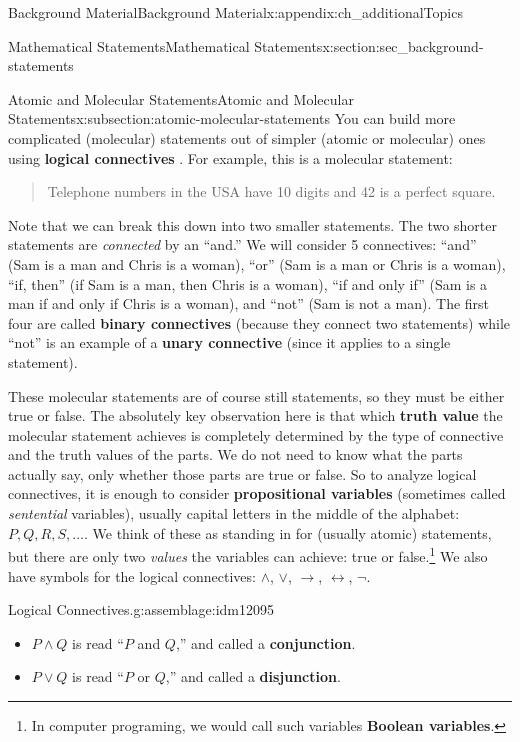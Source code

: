 \documentclass[oneside,10pt,]{book}
\newcommand{\terminology}[1]{\textbf{#1}}
\numberwithin{equation}{chapter}
\def\iff{\leftrightarrow}
\def\imp{\rightarrow}
\begin{document}
\begin{appendixptx}{Background Material}{}{Background Material}{}{}{x:appendix:ch_additionalTopics}
\begin{sectionptx}{Mathematical Statements}{}{Mathematical Statements}{}{}{x:section:sec_background-statements}
\begin{subsectionptx}{Atomic and Molecular Statements}{}{Atomic and Molecular Statements}{}{}{x:subsection:atomic-molecular-statements}
You can build more complicated (molecular) statements out of simpler (atomic or molecular) ones using \terminology{logical connectives} . For example, this is a molecular statement:%
\begin{quote}%
Telephone numbers in the USA have 10 digits and 42 is a perfect square.%
\end{quote}
Note that we can break this down into two smaller statements. The two shorter statements are \emph{connected} by an ``and.'' We will consider 5 connectives: ``and'' (Sam is a man and Chris is a woman), ``or'' (Sam is a man or Chris is a woman), ``if\textellipsis{}, then\textellipsis{}'' (if Sam is a man, then Chris is a woman), ``if and only if'' (Sam is a man if and only if Chris is a woman), and ``not'' (Sam is not a man). The first four are called \terminology{binary connectives} (because they connect two statements) while ``not'' is an example of a \terminology{unary connective} (since it applies to a single statement).%
\par
These molecular statements are of course still statements, so they must be either true or false.  The absolutely key observation here is that which \terminology{truth value}  the molecular statement achieves is completely determined by the type of connective and the truth values of the parts. We do not need to know what the parts actually say, only whether those parts are true or false. So to analyze logical connectives, it is enough to consider \terminology{propositional variables} (sometimes called \emph{sentential} variables), usually capital letters in the middle of the alphabet: \(P, Q, R, S, \ldots\).  We think of these as standing in for (usually atomic) statements, but there are only two \emph{values} the variables can achieve: true or false.\footnote{In computer programing, we would call such variables \terminology{Boolean variables}.\label{g:fn:idm12085}} \label{g:notation:idm12087} We also have symbols for the logical connectives: \(\wedge\), \(\vee\), \(\imp\), \(\iff\), \(\neg\).%
\begin{assemblage}{Logical Connectives.}{g:assemblage:idm12095}%
%
\begin{itemize}[label=\textbullet]
\item{}\(P \wedge Q\) is read ``\(P\) and \(Q\),'' and called a \terminology{conjunction}.  \label{g:notation:idm12110}%
\item{}\(P \vee Q\) is read ``\(P\) or \(Q\),'' and called a \terminology{disjunction}.  \label{g:notation:idm12125}%

\end{itemize}
\end{assemblage}
\end{subsectionptx}
\end{sectionptx}
\end{appendixptx}
\end{document}
